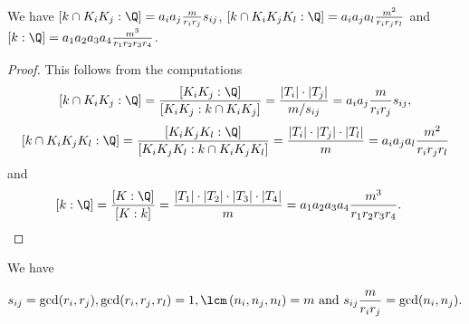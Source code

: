 \begin{cor}\label{compcap}
We have $[k\cap K_iK_j:\Q]=a_ia_j\frac{m}{r_ir_j}s_{ij}$, $[k\cap K_iK_jK_l:\Q]=a_ia_ja_l\frac{m^2}{r_ir_jr_l}$ and $[k:\Q]=a_1a_2a_3a_4\frac{m^3}{r_1r_2r_3r_4}$.
\end{cor}
\begin{proof}
This follows from the computations
$$[k\cap K_iK_j:\Q]=\frac{[K_iK_j:\Q]}{[K_iK_j:k\cap K_iK_j]}=\frac{|T_i|\cdot|T_j|}{m/s_{ij}}=a_ia_j\frac{m}{r_ir_j}s_{ij},$$
$$[k\cap K_iK_jK_l:\Q]=\frac{[K_iK_jK_l:\Q]}{[K_iK_jK_l:k\cap K_iK_jK_l]}=\frac{|T_i|\cdot|T_j|\cdot|T_l|}{m}=a_ia_ja_l\frac{m^2}{r_ir_jr_l}$$
and
\begin{equation*}
\begin{split}
[k:\Q]&=\frac{[K:\Q]}{[K:k]}=\frac{|T_1|\cdot|T_2|\cdot|T_3|\cdot|T_4|}{m}=
a_1a_2a_3a_4\frac{m^3}{r_1r_2r_3r_4}.
\end{split}
\end{equation*}

\end{proof}
\begin{lemma}\label{coprime}
We have 

$$s_{ij}=\gcd(r_i,r_j), \gcd(r_i,r_j,r_l)=1, \lcm\left(n_i,n_j,n_l\right)=m \text{ and } s_{ij}\frac{m}{r_ir_j}=\gcd(n_i,n_j).$$ %
\end{lemma}
